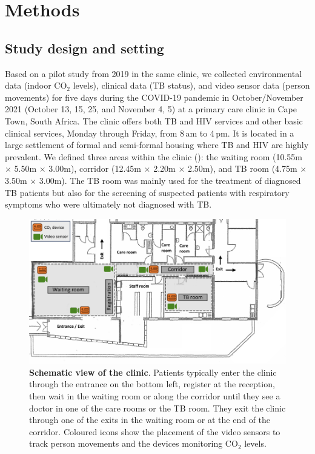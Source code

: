 \documentclass[fleqn,11pt]{wlscirep}
\begin{document}
\newpage

\section*{Methods}

\subsection*{Study design and setting}

Based on a pilot study from 2019 in the same clinic\cite{Zurcher2022JID,Zurcher2020BMJ}, we collected environmental data (indoor CO$_2$ levels), clinical data (TB status), and video sensor data (person movements) for five days during the COVID-19 pandemic in October/November 2021 (October 13, 15, 25, and November 4, 5) at a primary care clinic in Cape Town, South Africa. The clinic offers both TB and HIV services and other basic clinical services, Monday through Friday, from 8\,am to 4\,pm. It is located in a large settlement of formal and semi-formal housing where TB and HIV are highly prevalent\cite{Wood2007AMJRCCD,Middelkoop2011JAIDS}. We defined three areas within the clinic (): the waiting room (10.55m $\times$ 5.50m $\times$ 3.00m), corridor (12.45m $\times$ 2.20m $\times$ 2.50m), and TB room (4.75m $\times$ 3.50m $\times$ 3.00m). The TB room was mainly used for the treatment of diagnosed TB patients but also for the screening of suspected patients with respiratory symptoms who were ultimately not diagnosed with TB.

\begin{figure}[!htpb]
    \centering
    \includegraphics{doc/clinic-schematic-annotated-view.pdf}
    \caption{\textbf{Schematic view of the clinic}. Patients typically enter the clinic through the entrance on the bottom left, register at the reception, then wait in the waiting room or along the corridor until they see a doctor in one of the care rooms or the TB room. They exit the clinic through one of the exits in the waiting room or at the end of the corridor. Coloured icons show the placement of the video sensors to track person movements and the devices monitoring CO$_2$ levels.}
    \label{fig:floor-plan}
\end{figure}
\end{document}

